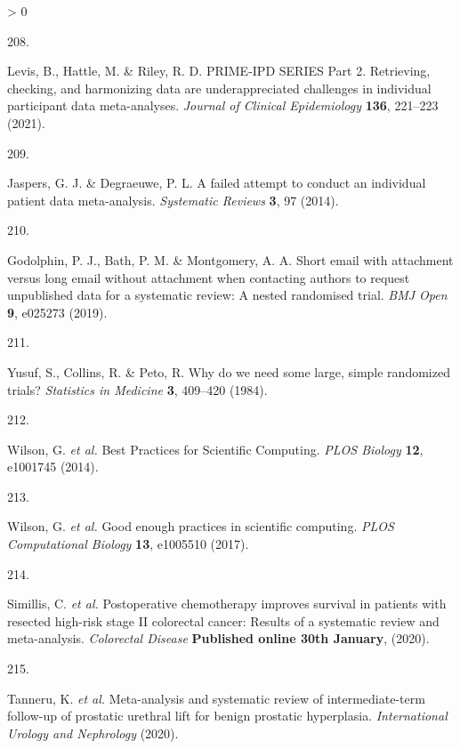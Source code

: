 \documentclass[a4paper, twoside]{templates/ociamthesis}
\newlength{\cslhangindent}
\newlength{\csllabelwidth}
\newenvironment{CSLReferences}[3] %
 {%
  \setlength{\parindent}{0pt}
  \ifodd #1 \everypar{\setlength{\hangindent}{\cslhangindent}}\ignorespaces\fi
  \ifnum #2 > 0
  \setlength{\parskip}{#2\baselineskip}
  \fi
 }%
 {}
\newcommand{\CSLLeftMargin}[1]{\parbox[t]{\maxof{\widthof{#1}}{\csllabelwidth}}{#1}}
\newcommand{\CSLRightInline}[1]{\parbox[t]{\linewidth - \csllabelwidth}{#1}}
\begin{document}
\begin{CSLReferences}{0}{0}
\leavevmode\hypertarget{ref-levis2021}{}%
\CSLLeftMargin{208. }
\CSLRightInline{Levis, B., Hattle, M. \& Riley, R. D. {PRIME}-{IPD SERIES Part} 2. {Retrieving}, checking, and harmonizing data are underappreciated challenges in individual participant data meta-analyses. \emph{Journal of Clinical Epidemiology} \textbf{136}, 221--223 (2021).}

\leavevmode\hypertarget{ref-jaspers2014}{}%
\CSLLeftMargin{209. }
\CSLRightInline{Jaspers, G. J. \& Degraeuwe, P. L. A failed attempt to conduct an individual patient data meta-analysis. \emph{Systematic Reviews} \textbf{3}, 97 (2014).}

\leavevmode\hypertarget{ref-godolphin2019a}{}%
\CSLLeftMargin{210. }
\CSLRightInline{Godolphin, P. J., Bath, P. M. \& Montgomery, A. A. Short email with attachment versus long email without attachment when contacting authors to request unpublished data for a systematic review: A nested randomised trial. \emph{BMJ Open} \textbf{9}, e025273 (2019).}

\leavevmode\hypertarget{ref-yusuf1984}{}%
\CSLLeftMargin{211. }
\CSLRightInline{Yusuf, S., Collins, R. \& Peto, R. Why do we need some large, simple randomized trials? \emph{Statistics in Medicine} \textbf{3}, 409--420 (1984).}

\leavevmode\hypertarget{ref-wilson2014}{}%
\CSLLeftMargin{212. }
\CSLRightInline{Wilson, G. \emph{et al.} Best {Practices} for {Scientific Computing}. \emph{PLOS Biology} \textbf{12}, e1001745 (2014).}

\leavevmode\hypertarget{ref-wilson2017}{}%
\CSLLeftMargin{213. }
\CSLRightInline{Wilson, G. \emph{et al.} Good enough practices in scientific computing. \emph{PLOS Computational Biology} \textbf{13}, e1005510 (2017).}

\leavevmode\hypertarget{ref-simillis2020}{}%
\CSLLeftMargin{214. }
\CSLRightInline{Simillis, C. \emph{et al.} Postoperative chemotherapy improves survival in patients with resected high-risk stage {II} colorectal cancer: Results of a systematic review and meta-analysis. \emph{Colorectal Disease} \textbf{Published online 30th January}, (2020).}

\leavevmode\hypertarget{ref-tanneru2020}{}%
\CSLLeftMargin{215. }
\CSLRightInline{Tanneru, K. \emph{et al.} Meta-analysis and systematic review of intermediate-term follow-up of prostatic urethral lift for benign prostatic hyperplasia. \emph{International Urology and Nephrology} (2020).}

\end{CSLReferences}
\end{document}
